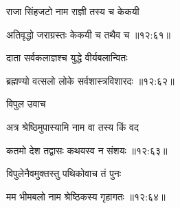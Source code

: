 {\devanagarifont राजा सिंहजटो नाम राज्ञी तस्य च केकयी \thinspace{\dandab} \dontdisplaylinenum }%


{\devanagarifont अतिवृद्धो जराग्रस्तः केकयी च तथैव च {॥१२:६१॥} \veg\dontdisplaylinenum }%

{\devanagarifont दाता सर्वकलाज्ञश्च युद्धे वीर्यबलान्वितः \thinspace{\dandab} \dontdisplaylinenum }%


{\devanagarifont ब्रह्मण्यो वत्सलो लोके सर्वशास्त्रविशारदः {॥१२:६२॥} \veg\dontdisplaylinenum }%
 
{\devanagarifont विपुल उवाच {\dandab}\dontdisplaylinenum  }%
 
{\devanagarifont अत्र श्रेष्ठिमुपास्यामि नाम वा तस्य किं वद \thinspace{\danda} \dontdisplaylinenum }%


{\devanagarifont कतमो देश तद्वासः कथयस्व न संशयः {॥१२:६३॥} \veg\dontdisplaylinenum }%

{\devanagarifont विपुलेनैवमुक्तस्तु पथिकोवाच तं पुनः \thinspace{\dandab} \dontdisplaylinenum }%


{\devanagarifont मम भीमबलो नाम श्रेष्ठिकस्य गृहागतः {॥१२:६४॥} \veg\dontdisplaylinenum }%

